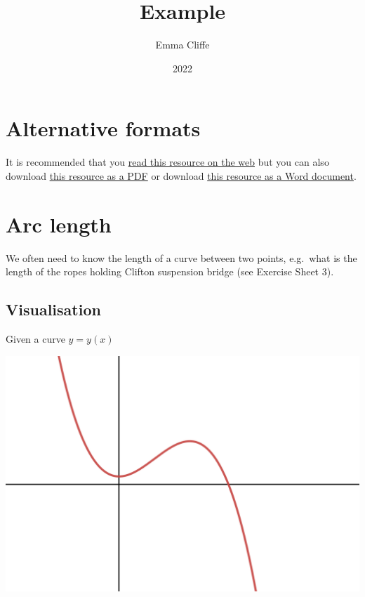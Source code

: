 \documentclass[
  12pt,
  a4paper]{article}
\title{Example}
\author{Emma Cliffe}
\date{2022}
\begin{document}
\maketitle

{
\hypersetup{linkcolor=}
\setcounter{tocdepth}{2}
\tableofcontents
}
\hypertarget{alternative-formats}{%
\section{Alternative formats}\label{alternative-formats}}

It is recommended that you \href{./arclengthInR.html}{read this resource
on the web} but you can also download \href{./arclengthInR.pdf}{this
resource as a PDF} or download \href{./arclengthInR.docx}{this resource
as a Word document}.

\hypertarget{arc-length}{%
\section{Arc length}\label{arc-length}}

We often need to know the length of a curve between two points,
e.g.~what is the length of the ropes holding Clifton suspension bridge
(see Exercise Sheet 3).

\hypertarget{visualisation}{%
\subsection{Visualisation}\label{visualisation}}

Given a curve \(y=y(x)\)

\centering

\includegraphics[height=0.2\textheight]{arclength1}
\end{document}
